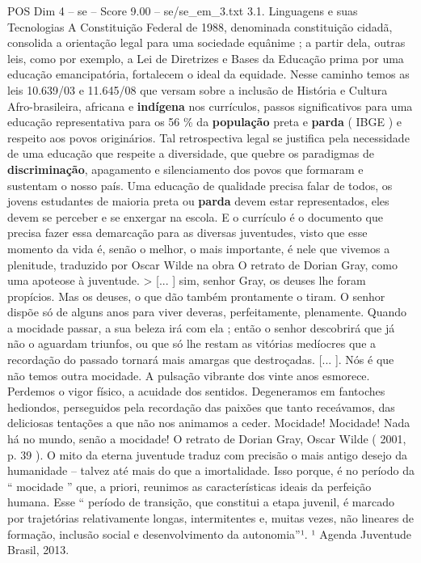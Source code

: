 \begin{textsample}{POS Dim 4 – se – Score 9.00 – se/se\_em\_3.txt}  \label{ex:f4_pos_142}
3.1.
Linguagens e suas Tecnologias A Constituição Federal de 1988, denominada constituição cidadã, consolida a orientação legal para uma sociedade equânime ; a partir dela, outras leis, como por exemplo, a Lei de Diretrizes e Bases da Educação prima por uma educação emancipatória, fortalecem o ideal da equidade.
Nesse caminho temos as leis 10.639/03 e 11.645/08 que versam sobre a inclusão de História e Cultura Afro-brasileira, africana e \textbf{indígena} nos currículos, passos significativos para uma educação representativa para os 56 \% da \textbf{população} preta e \textbf{parda} ( IBGE ) e respeito aos povos originários.
Tal retrospectiva legal se justifica pela necessidade de uma educação que respeite a diversidade, que quebre os paradigmas de \textbf{discriminação}, apagamento e silenciamento dos povos que formaram e sustentam o nosso país.
Uma educação de qualidade precisa falar de todos, os jovens estudantes de maioria preta ou \textbf{parda} devem estar representados, eles devem se perceber e se enxergar na escola.
E o currículo é o documento que precisa fazer essa demarcação para as diversas juventudes, visto que esse momento da vida é, senão o melhor, o mais importante, é nele que vivemos a plenitude, traduzido por Oscar Wilde na obra O retrato de Dorian Gray, como uma apoteose à juventude. > [... ] sim, senhor Gray, os deuses lhe foram propícios.
Mas os deuses, o que dão também prontamente o tiram.
O senhor dispõe só de alguns anos para viver deveras, perfeitamente, plenamente.
Quando a mocidade passar, a sua beleza irá com ela ; então o senhor descobrirá que já não o aguardam triunfos, ou que só lhe restam as vitórias medíocres que a recordação do passado tornará mais amargas que destroçadas. [... ].
Nós é que não temos outra mocidade.
A pulsação vibrante dos vinte anos esmorece.
Perdemos o vigor físico, a acuidade dos sentidos.
Degeneramos em fantoches hediondos, perseguidos pela recordação das paixões que tanto receávamos, das deliciosas tentações a que não nos animamos a ceder.
Mocidade!
Mocidade!
Nada há no mundo, senão a mocidade!
O retrato de Dorian Gray, Oscar Wilde ( 2001, p. 39 ).
O mito da eterna juventude traduz com precisão o mais antigo desejo da humanidade – talvez até mais do que a imortalidade.
Isso porque, é no período da “ mocidade ” que, a priori, reunimos as características ideais da perfeição humana.
Esse “ período de transição, que constitui a etapa juvenil, é marcado por trajetórias relativamente longas, intermitentes e, muitas vezes, não lineares de formação, inclusão social e desenvolvimento da autonomia”¹. ¹ Agenda Juventude Brasil, 2013.

\end{textsample}
